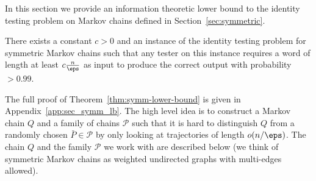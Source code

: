 
\label{sec:symm-lower-bound}
In this section we provide an information theoretic lower bound to the identity testing problem on Markov chains defined in Section~\ref{sec:symmetric}. 
\begin{theorem}
\label{thm:symm-lower-bound}
There exists a constant $c > 0$ and an instance of the identity testing problem for symmetric Markov chains such that any tester on this instance requires
a word of length at least $c\frac{n}{\eps}$ as input to produce the correct output with probability $> 0.99$. %
%
\end{theorem}
The full proof of Theorem~\ref{thm:symm-lower-bound} is given in Appendix~\ref{app:sec_symm_lb}. The high level idea is to construct a Markov chain $Q$ and a family of chains $\mathcal{P}$ such that it is hard to distinguish $Q$ from a randomly chosen $\bar{P} \in \mathcal{P}$ by only looking at trajectories of length $o(n/\eps)$. The chain $Q$ and the family $\mathcal{P}$ we work with are described below (we think of symmetric Markov chains as weighted undirected graphs with multi-edges allowed).
